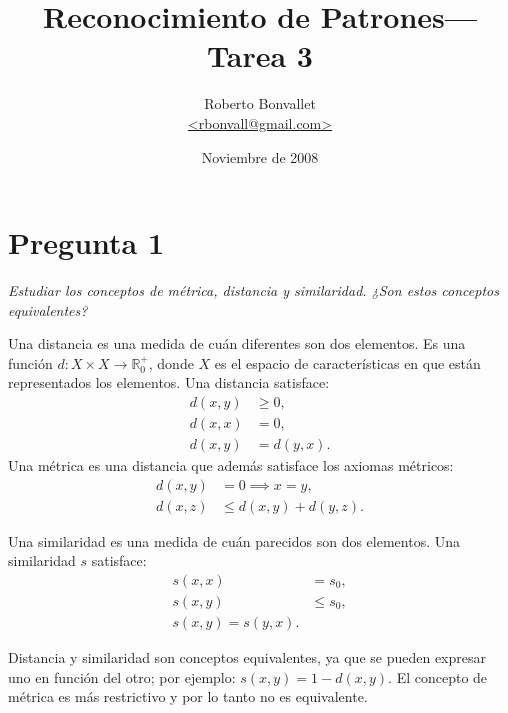 \documentclass[spanish]{article}
\title{Reconocimiento de Patrones---Tarea 3}
\author{Roberto Bonvallet \\ \url {<rbonvall@gmail.com>}}
\date{Noviembre de 2008}
\newcommand{\pregunta}{\textit}
\newcommand{\R}{\mathbb{R}}
\begin{document}
\maketitle

\section*{Pregunta 1}
\pregunta{
    Estudiar los conceptos de métrica, distancia y similaridad.
    ¿Son estos conceptos equivalentes?
}

Una distancia es una medida de cuán diferentes son dos elementos.  Es una
función $d:X\times X\to\R_0^+$, donde $X$ es el espacio de características en
que están representados los elementos.  Una distancia satisface\footnotemark:
\begin{align*}
    d(x, y) &\ge 0, \\ d(x, x) &= 0, \\ d(x, y) &= d(y, x).
\end{align*}
Una métrica es una distancia que además satisface los axiomas métricos:
\begin{align*}
    d(x, y) &= 0\implies x = y, \\
    d(x, z) &\le d(x, y) + d(y, z).
\end{align*}

Una similaridad es una medida de cuán parecidos son dos elementos.  Una similaridad $s$ satisface:
\begin{align*}
    s(x, x) &= s_0, \\
    s(x, y) &\le s_0, \\
    s(x, y) = s(y, x).
\end{align*}

Distancia y similaridad son conceptos equivalentes, ya que se pueden expresar uno en función del
otro; por ejemplo: $s(x, y) = 1 - d(x, y)$.  El concepto de métrica es más restrictivo y por lo
tanto no es equivalente.
\end{document}
